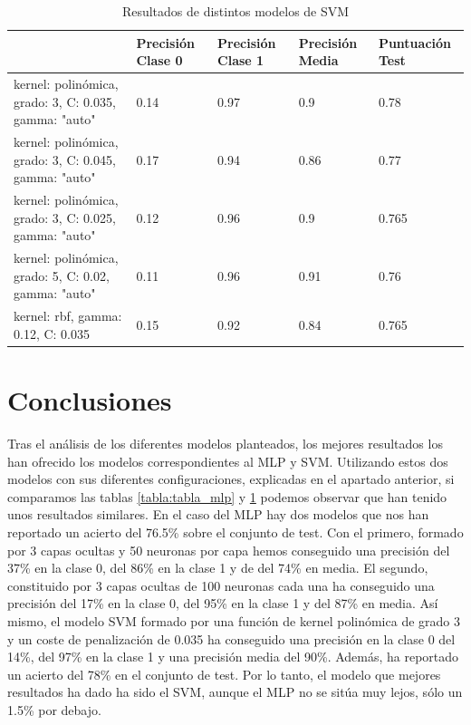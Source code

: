 \documentclass[journal,twoside]{JoPhA}
\begin{document}
\begin{table}[htb!]
	\begin{center}
		\caption{Resultados de distintos modelos de SVM}
		\begin{tabular}{| m{2.1cm} | m{1cm} | m{1cm} | m{1cm} | m{1.2cm} |}
			\hline
			& Precisión Clase 0 & Precisión Clase 1 & Precisión Media & Puntuación Test   \\ \hline
			kernel: polinómica, grado: 3, C: 0.035, gamma: "auto" & 0.14                & 0.97                & 0.9              & 0.78  \\ \hline
			kernel: polinómica, grado: 3, C: 0.045, gamma: "auto" & 0.17                & 0.94               & 0.86             & 0.77  \\ \hline
			kernel: polinómica, grado: 3, C: 0.025, gamma: "auto" & 0.12 & 0.96 & 0.9 & 0.765 \\ \hline
			kernel: polinómica, grado: 5, C: 0.02, gamma: "auto" & 0.11 & 0.96 & 0.91 & 0.76    \\ \hline
			kernel: rbf, gamma: 0.12, C: 0.035 & 0.15 & 0.92 & 0.84 & 0.765 \\ \hline
			
		\end{tabular}
		
		\label{tabla:tabla_svm}
	\end{center}
\end{table}


\section{Conclusiones}
Tras el análisis de los diferentes modelos planteados, los mejores resultados los han ofrecido los modelos correspondientes al MLP y SVM. Utilizando estos dos modelos con sus diferentes configuraciones, explicadas en el apartado anterior, si comparamos las tablas \ref{tabla:tabla_mlp} y \ref{tabla:tabla_svm} podemos observar que han tenido unos resultados similares. En el caso del MLP hay dos modelos que nos han reportado un acierto del 76.5\% sobre el conjunto de test. Con el primero, formado por 3 capas ocultas y 50 neuronas por capa hemos conseguido una precisión del 37\% en la clase 0, del 86\% en la clase 1 y de del 74\% en media. El segundo, constituido por 3 capas ocultas de 100 neuronas cada una ha conseguido una precisión del 17\% en la clase 0, del 95\% en la clase 1 y del 87\% en media. Así mismo, el modelo SVM formado por una función de kernel polinómica de grado 3 y un coste de penalización de 0.035 ha conseguido una precisión en la clase 0 del 14\%, del 97\% en la clase 1 y una precisión media del 90\%. Además, ha reportado un acierto del 78\% en el conjunto de test. Por lo tanto, el modelo que mejores resultados ha dado ha sido el SVM, aunque el MLP no se sitúa muy lejos, sólo un 1.5\% por debajo.\\
\end{document}
